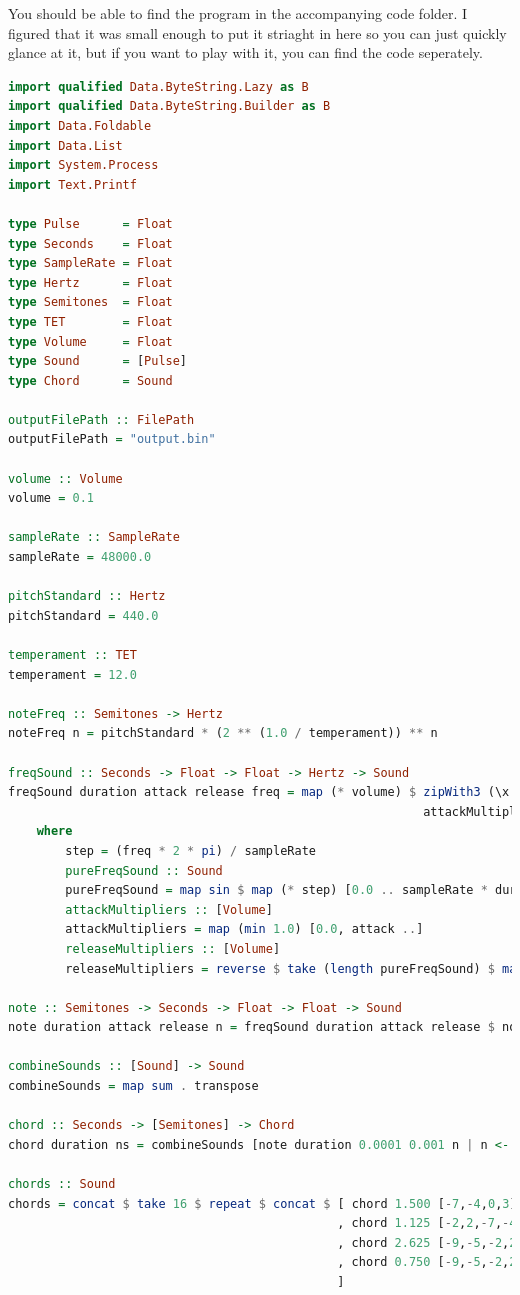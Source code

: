 \documentclass[11pt]{article}
\begin{document}
You should be able to find the program in the accompanying code folder. I
figured that it was small enough to put it striaght in here so you can just
quickly glance at it, but if you want to play with it, you can find the code
seperately.

\begin{lstlisting}[language=Haskell, basicstyle=\tiny]
import qualified Data.ByteString.Lazy as B
import qualified Data.ByteString.Builder as B
import Data.Foldable
import Data.List
import System.Process
import Text.Printf

type Pulse      = Float
type Seconds    = Float
type SampleRate = Float
type Hertz      = Float
type Semitones  = Float
type TET        = Float
type Volume     = Float
type Sound      = [Pulse]
type Chord      = Sound

outputFilePath :: FilePath
outputFilePath = "output.bin"

volume :: Volume
volume = 0.1

sampleRate :: SampleRate
sampleRate = 48000.0

pitchStandard :: Hertz
pitchStandard = 440.0

temperament :: TET
temperament = 12.0

noteFreq :: Semitones -> Hertz
noteFreq n = pitchStandard * (2 ** (1.0 / temperament)) ** n

freqSound :: Seconds -> Float -> Float -> Hertz -> Sound
freqSound duration attack release freq = map (* volume) $ zipWith3 (\x y z -> x * y * z)
                                                          attackMultipliers releaseMultipliers pureFreqSound
    where
        step = (freq * 2 * pi) / sampleRate
        pureFreqSound :: Sound
        pureFreqSound = map sin $ map (* step) [0.0 .. sampleRate * duration]
        attackMultipliers :: [Volume]
        attackMultipliers = map (min 1.0) [0.0, attack ..]
        releaseMultipliers :: [Volume]
        releaseMultipliers = reverse $ take (length pureFreqSound) $ map (min 1.0) [0.0, release ..]

note :: Semitones -> Seconds -> Float -> Float -> Sound
note duration attack release n = freqSound duration attack release $ noteFreq n

combineSounds :: [Sound] -> Sound
combineSounds = map sum . transpose

chord :: Seconds -> [Semitones] -> Chord
chord duration ns = combineSounds [note duration 0.0001 0.001 n | n <- ns]

chords :: Sound
chords = concat $ take 16 $ repeat $ concat $ [ chord 1.500 [-7,-4,0,3]
                                              , chord 1.125 [-2,2,-7,-4]
                                              , chord 2.625 [-9,-5,-2,2]
                                              , chord 0.750 [-9,-5,-2,2]
                                              ]


\end{lstlisting}
\end{document}
